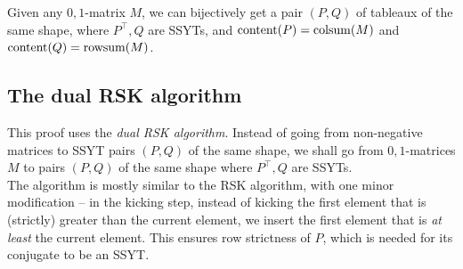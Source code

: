 	\begin{ftheo}
		Given any $0,1$-matrix $M$, we can bijectively get a pair $(P,Q)$ of tableaux of the same shape, where $P^\top, Q$ are SSYTs, and $\operatorname{content}(P) = \operatorname{colsum}(M)$ and $\operatorname{content}(Q) = \operatorname{rowsum}(M)$.  
	\end{ftheo}

\subsection{The dual RSK algorithm}

	This proof uses the \emph{dual RSK algorithm}. Instead of going from non-negative matrices to SSYT pairs $(P,Q)$ of the same shape, we shall go from $0,1$-matrices $M$ to pairs $(P,Q)$ of the same shape where $P^\top,Q$ are SSYTs.\\
	The algorithm is mostly similar to the RSK algorithm, with one minor modification -- in the kicking step, instead of kicking the first element that is (strictly) greater than the current element, we insert the first element that is \emph{at least} the current element. This ensures row strictness of $P$, which is needed for its conjugate to be an SSYT.

